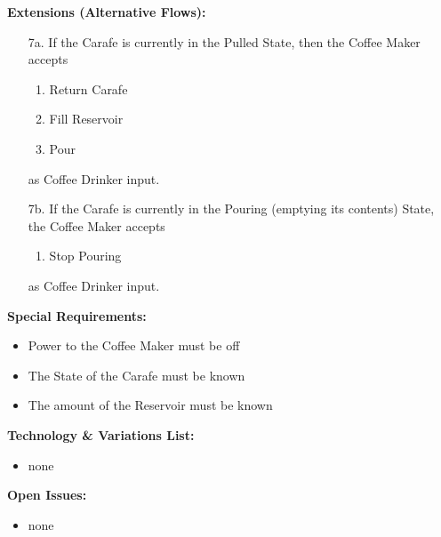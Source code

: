 \documentclass[letterpaper]{article}
\begin{document}
\textbf{Extensions (Alternative Flows):}
\begin{itemize}
\item[7a.]If the Carafe is currently in the Pulled State, then the
Coffee Maker accepts
\begin{enumerate}
\item Return Carafe
\item Fill Reservoir
\item Pour
\end{enumerate}
as Coffee Drinker input.
\item[7b.]If the Carafe is currently in the Pouring (emptying its
contents) State, the Coffee Maker accepts
\begin{enumerate}
\item Stop Pouring
\end{enumerate}
as Coffee Drinker input.
\end{itemize}
\textbf{Special Requirements: }
\begin{itemize}
\item Power to the Coffee Maker must be off
\item The State of the Carafe must be known
\item The amount of the Reservoir must be known
\end{itemize}
\textbf{Technology \& Variations List:}
\begin{itemize}
\item none
\end{itemize}
\textbf{Open Issues:}
\begin{itemize}
\item none
\end{itemize}
\end{document}
